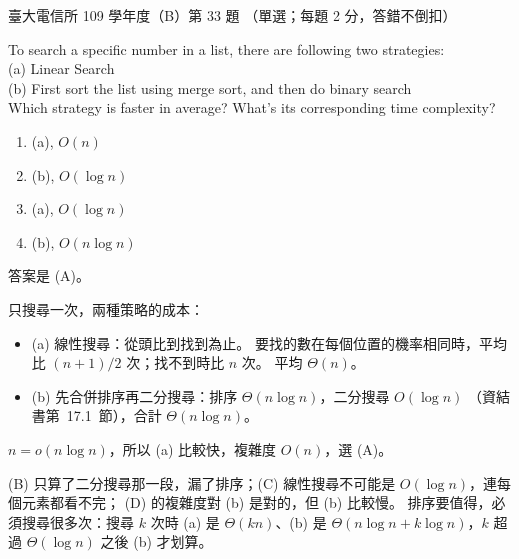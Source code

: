 \begin{pastexam}[label={px:ntu-109-comm-dsa-33}]{臺大電信所 109 學年度（B）第 33 題}
（單選；每題 2 分，答錯不倒扣）

To search a specific number in a list, there are following two strategies:\\
(a) Linear Search\\
(b) First sort the list using merge sort, and then do binary search\\
Which strategy is faster in average? What's its corresponding time complexity?
\begin{enumerate}[label=(\Alph*)]
\item (a), $O(n)$
\item (b), $O(\log n)$
\item (a), $O(\log n)$
\item (b), $O(n\log n)$
\end{enumerate}
\end{pastexam}

\begin{pastsoln}
答案是 (A)。

只搜尋一次，兩種策略的成本：
\begin{itemize}
\item (a) 線性搜尋：從頭比到找到為止。 要找的數在每個位置的機率相同時，平均比
$(n + 1)/2$ 次；找不到時比 $n$ 次。 平均 $\Theta(n)$。
\item (b) 先合併排序再二分搜尋：排序 $\Theta(n \log n)$，二分搜尋 $O(\log n)$
（資結書第~17.1~節），合計 $\Theta(n \log n)$。
\end{itemize}
$n = o(n\log n)$，所以 (a) 比較快，複雜度 $O(n)$，選 (A)。

(B) 只算了二分搜尋那一段，漏了排序；(C) 線性搜尋不可能是 $O(\log n)$，連每個元素都看不完；
(D) 的複雜度對 (b) 是對的，但 (b) 比較慢。 排序要值得，必須搜尋很多次：搜尋 $k$ 次時 (a) 是
$\Theta(kn)$、(b) 是 $\Theta(n\log n + k\log n)$，$k$ 超過 $\Theta(\log n)$ 之後 (b) 才划算。
\end{pastsoln}
